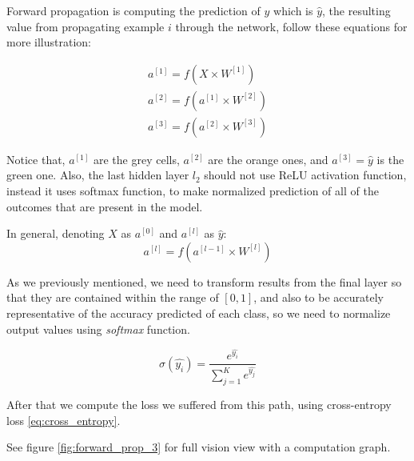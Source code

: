 Forward propagation is computing the prediction of $y$ which is $\hat{y}$, the resulting value from propagating example $i$ through the network, follow these equations for more illustration:

\begin{equation} \label{eq:forward_prop_1}
\begin{split}
    a^{[1]} = f \left( X \times W^{[1]} \right) \\
    a^{[2]} = f \left( a^{[1]} \times W^{[2]} \right) \\
    a^{[3]} = f \left( a^{[2]} \times W^{[3]} \right)
\end{split}
\end{equation}


Notice that, $a^{[1]}$ are the grey cells, $a^{[2]}$ are the orange ones, and $a^{[3]}=\hat{y}$ is the green one. Also, the last hidden layer $l_2$ should not use ReLU activation function, instead it uses softmax function, to make normalized prediction of all of the outcomes that are present in the model.\newline

In general, denoting $X$ as $a^{[0]}$ and $a^{[l]}$ as $\hat{y}$:
\begin{equation}\label{eq:forward_prop_2}
    a^{[l]} = f \left( a^{[l-1]} \times W^{[l]} \right)
\end{equation}

As we previously mentioned, we need to transform results from the final layer so that they are contained within the range of $[0,1]$, and also to be accurately representative of the accuracy predicted of each class, so we need to normalize output values using \textit{softmax} function.\newline

\begin{equation}\label{eq:softmax}
   \sigma (\hat{y_i}) = \frac{e^{\hat{y_i}}}{\sum_{j=1}^{K} e^{\hat{y_j}}}
\end{equation}


After that we compute the loss we suffered from this path, using cross-entropy loss \ref{eq:cross_entropy}.

See figure \ref{fig:forward_prop_3} for full vision view with a computation graph.

